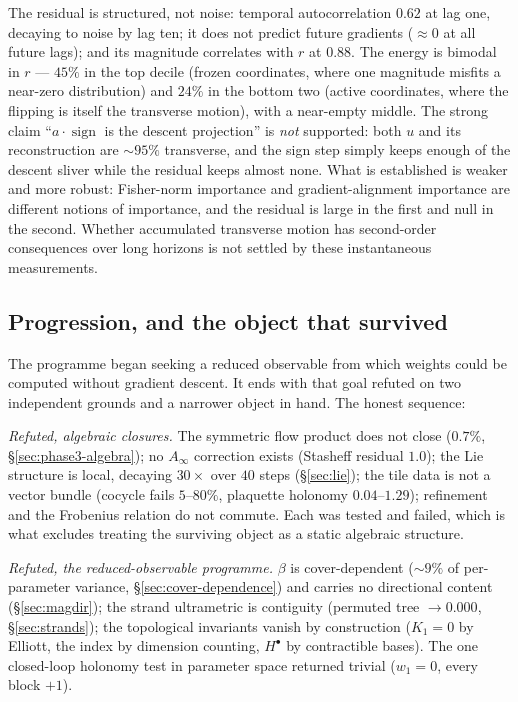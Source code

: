 The residual is structured, not noise: temporal autocorrelation $0.62$ at lag
one, decaying to noise by lag ten; it does not predict future gradients
($\approx 0$ at all future lags); and its magnitude correlates with $r$ at
$0.88$. The energy is bimodal in $r$ --- $45\%$ in the top decile (frozen
coordinates, where one magnitude misfits a near-zero distribution) and $24\%$ in
the bottom two (active coordinates, where the flipping is itself the transverse
motion), with a near-empty middle. The strong claim ``$a\cdot\operatorname{sign}$
is the descent projection'' is \emph{not} supported: both $u$ and its
reconstruction are $\sim\!95\%$ transverse, and the sign step simply keeps enough
of the descent sliver while the residual keeps almost none. What is established
is weaker and more robust: Fisher-norm importance and gradient-alignment
importance are different notions of importance, and the residual is large in the
first and null in the second. Whether accumulated transverse motion has
second-order consequences over long horizons is not settled by these
instantaneous measurements.

\subsection{Progression, and the object that survived}
\label{sec:progression}

The programme began seeking a reduced observable from which weights could be
computed without gradient descent. It ends with that goal refuted on two
independent grounds and a narrower object in hand. The honest sequence:

\emph{Refuted, algebraic closures.} The symmetric flow product does not close
($0.7\%$, \S\ref{sec:phase3-algebra}); no $A_\infty$ correction exists (Stasheff
residual $1.0$); the Lie structure is local, decaying $30\times$ over $40$ steps
(\S\ref{sec:lie}); the tile data is not a vector bundle (cocycle fails
$5$--$80\%$, plaquette holonomy $0.04$--$1.29$); refinement and the Frobenius
relation do not commute. Each was tested and failed, which is what excludes
treating the surviving object as a static algebraic structure.

\emph{Refuted, the reduced-observable programme.} $\beta$ is cover-dependent
($\sim\!9\%$ of per-parameter variance, \S\ref{sec:cover-dependence}) and carries
no directional content (\S\ref{sec:magdir}); the strand ultrametric is
contiguity (permuted tree $\to 0.000$, \S\ref{sec:strands}); the topological
invariants vanish by construction ($K_1=0$ by Elliott, the index by dimension
counting, $H^\bullet$ by contractible bases). The one closed-loop holonomy test
in parameter space returned trivial ($w_1=0$, every block $+1$).

